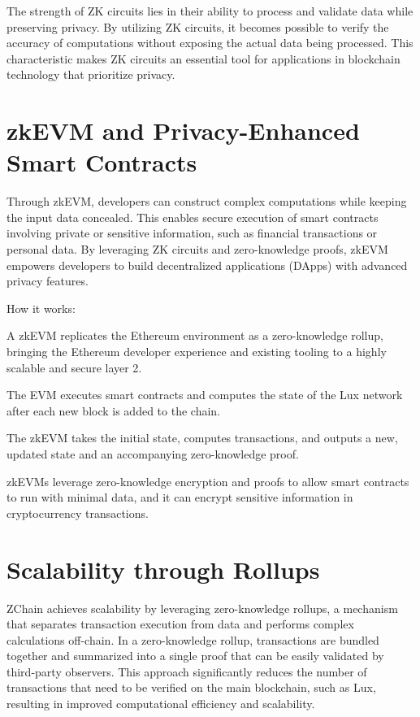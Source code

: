 \documentclass[11pt]{article}
\begin{document}
The strength of ZK circuits lies in their ability to process and validate data while preserving privacy. By utilizing ZK circuits, it becomes possible to verify the accuracy of computations without exposing the actual data being processed. This characteristic makes ZK circuits an essential tool for applications in blockchain technology that prioritize privacy.


\section{zkEVM and Privacy-Enhanced Smart Contracts}

Through zkEVM, developers can construct complex computations while keeping the input data concealed. This enables secure execution of smart contracts involving private or sensitive information, such as financial transactions or personal data. By leveraging ZK circuits and zero-knowledge proofs, zkEVM empowers developers to build decentralized applications (DApps) with advanced privacy features.


How it works:


A zkEVM replicates the Ethereum environment as a zero-knowledge rollup, bringing the Ethereum developer experience and existing tooling to a highly scalable and secure layer 2.


The EVM executes smart contracts and computes the state of the Lux network after each new block is added to the chain.


The zkEVM takes the initial state, computes transactions, and outputs a new, updated state and an accompanying zero-knowledge proof.


zkEVMs leverage zero-knowledge encryption and proofs to allow smart contracts to run with minimal data, and it can encrypt sensitive information in cryptocurrency transactions.


\section{Scalability through Rollups}

ZChain achieves scalability by leveraging zero-knowledge rollups, a mechanism that separates transaction execution from data and performs complex calculations off-chain. In a zero-knowledge rollup, transactions are bundled together and summarized into a single proof that can be easily validated by third-party observers. This approach significantly reduces the number of transactions that need to be verified on the main blockchain, such as Lux, resulting in improved computational efficiency and scalability.
\end{document}
